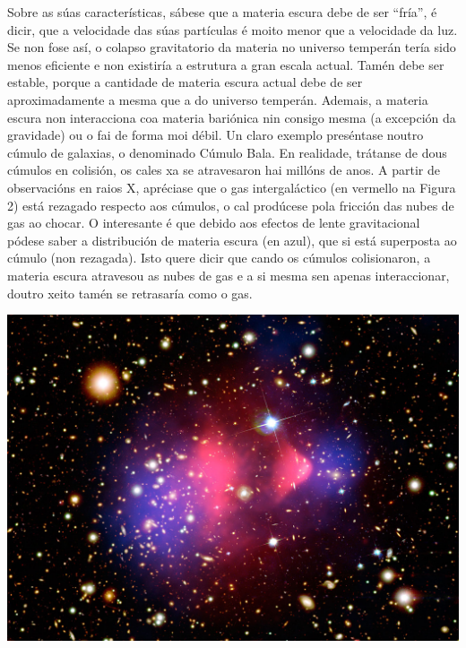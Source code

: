 \begin{refsection}
\begin{multicols}{2}
Sobre as súas características, sábese que a materia escura debe de ser “fría”, é dicir, que a velocidade das súas partículas é moito menor que a velocidade da luz. Se non fose así, o colapso gravitatorio da materia no universo temperán tería sido menos eficiente e non existiría a estrutura a gran escala actual. Tamén debe ser estable, porque a cantidade de materia escura actual debe de ser aproximadamente a mesma que a do universo temperán. Ademais, a materia escura non interacciona coa materia bariónica nin consigo mesma (a excepción da gravidade) ou o fai de forma moi débil. Un claro exemplo preséntase noutro cúmulo de galaxias, o denominado Cúmulo Bala. En realidade, trátanse de dous cúmulos en colisión, os cales xa se atravesaron hai millóns de anos. A partir de observacións en raios X, apréciase que o gas intergaláctico (en vermello na Figura 2) está rezagado respecto aos cúmulos, o cal prodúcese pola fricción das nubes de gas  ao chocar. O interesante é que debido aos efectos de lente gravitacional pódese saber a distribución de materia escura (en azul), que si está superposta ao cúmulo (non rezagada). Isto quere dicir que cando os cúmulos colisionaron, a materia escura atravesou as nubes de gas e a si mesma sen apenas interaccionar, doutro xeito tamén se retrasaría como o gas. \\

\begin{center}
    \includegraphics[width=0.85\linewidth]{revistas/002/imaxes/materiaescura2.png}
\end{center}


\end{multicols}
\end{refsection}
